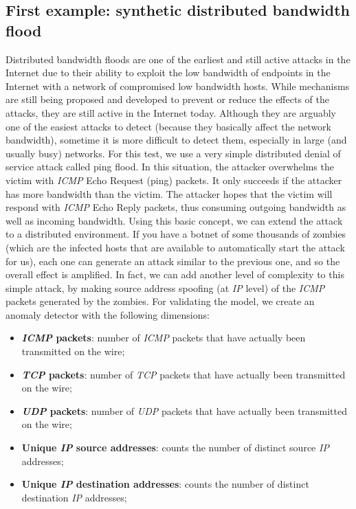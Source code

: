\documentclass[12pt,a4paper,cucitura]{toptesi}
\begin{document}
\subsection{First example: synthetic distributed bandwidth flood}
Distributed bandwidth floods are one of the earliest and still active attacks in the Internet due to their ability to exploit the low bandwidth of endpoints in the Internet with a network of compromised low bandwidth hosts. While mechanisms are still being proposed and developed to prevent or reduce the effects of the attacks, they are still active in the Internet today. Although they are arguably one of the easiest attacks to detect (because they basically affect the network bandwidth), sometime it is more difficult to detect them, especially in large (and usually busy) networks.
For this test, we use a very simple distributed denial of service attack called ping flood.
In this situation, the attacker overwhelms the victim with \emph{ICMP} Echo Request (ping) packets. It only succeeds if the attacker has more bandwidth than the victim. The attacker hopes that the victim will respond with \emph{ICMP} Echo Reply packets, thus consuming outgoing bandwidth as well as incoming bandwidth.
Using this basic concept, we can extend the attack to a distributed environment. If you have a botnet of some thousands of zombies (which are the infected hosts that are available to automatically start the attack for us), each one can generate an attack similar to the previous one, and so the overall effect is amplified. In fact, we can add another level of complexity to this simple attack, by making source address spoofing (at \emph{IP} level) of the \emph{ICMP} packets generated by the zombies.
For validating the model, we create an anomaly detector with the following dimensions:

\begin{itemize}
\item \textbf{\emph{ICMP} packets}: number of \emph{ICMP} packets that have actually been transmitted on the wire;
\item \textbf{\emph{TCP} packets}: number of \emph{TCP} packets that have actually been transmitted on the wire;
\item \textbf{\emph{UDP} packets}: number of \emph{UDP} packets that have actually been transmitted on the wire;
\item \textbf{Unique \emph{IP} source addresses}: counts the number of distinct source \emph{IP} addresses;
\item \textbf{Unique \emph{IP} destination addresses}: counts the number of distinct destination \emph{IP} addresses;
\end{itemize}
\end{document}
